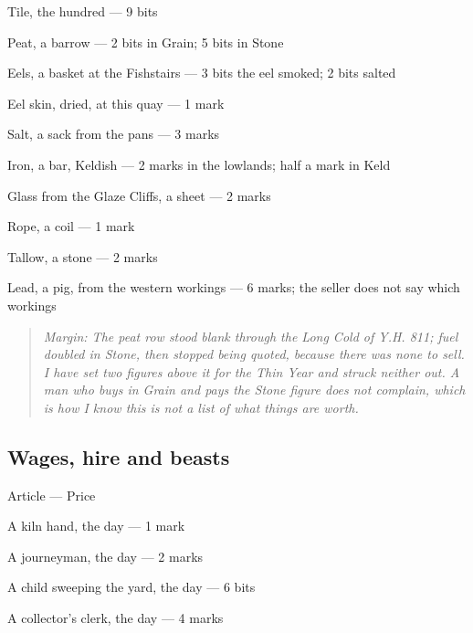 \documentclass{design/chronicle}
\begin{document}
Tile, the hundred — 9 bits\par

Peat, a barrow — 2 bits in Grain; 5 bits in Stone\par

Eels, a basket at the Fishstairs — 3 bits the eel smoked; 2 bits salted\par

Eel skin, dried, at this quay — 1 mark\par

Salt, a sack from the pans — 3 marks\par

Iron, a bar, Keldish — 2 marks in the lowlands; half a mark in Keld\par

Glass from the Glaze Cliffs, a sheet — 2 marks\par

Rope, a coil — 1 mark\par

Tallow, a stone — 2 marks\par

Lead, a pig, from the western workings — 6 marks; the seller does not say which workings\par

\begin{quote}\itshape \emph{Margin:} The peat row stood blank through the Long Cold of Y.H. 811; fuel doubled in Stone, then stopped being quoted, because there was none to sell. I have set two figures above it for the Thin Year and struck neither out. A man who buys in Grain and pays the Stone figure does not complain, which is how I know this is not a list of what things are worth.\end{quote}

\subsection*{Wages, hire and beasts}

Article — Price\par

A kiln hand, the day — 1 mark\par

A journeyman, the day — 2 marks\par

A child sweeping the yard, the day — 6 bits\par

A collector’s clerk, the day — 4 marks\par
\end{document}
